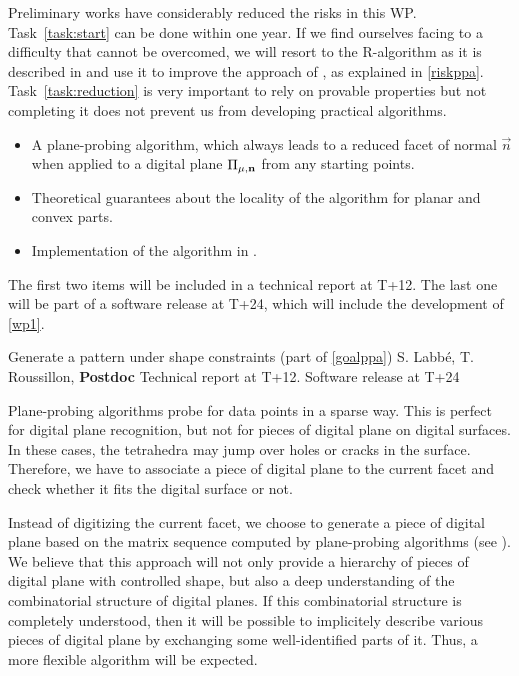 \Risks
Preliminary works have considerably reduced the risks in this WP. Task~\ref{task:start}
can be done within one year. If we find ourselves facing to a difficulty that cannot be overcomed,
we will resort to the R-algorithm as it is described in \cite{LPRJMIV2017} and use it
to improve the approach of \citeauthor*{Charrier2011} \cite{Charrier2011}, as explained
in \ref{riskppa}. Task~\ref{task:reduction} is very important to rely on provable
properties but not completing it does not prevent us from developing practical algorithms.

\Success
\begin{itemize}
    \item A plane-probing algorithm, which always leads to a
      reduced facet of normal $\vec{n}$ when applied to a digital
      plane $\Pi_{\mu,\mathbf{n}}$ from any starting points.
    \item Theoretical guarantees about the locality of the algorithm
      for planar and convex parts.   
    \item Implementation of the algorithm in \DGtal.   
\end{itemize}
The first two items will be included in a technical report at T+12.
The last one will be part of a software release at T+24, which will include
the development of \ref{wp1}. 

  

\medskip
{}
   {Generate a pattern under shape constraints (part of \ref{goalppa})}
   {S. Labb\'{e}, T. Roussillon, \textbf{Postdoc}}
   {Technical report at T+12. Software release at T+24}
\medskip

Plane-probing algorithms probe for data points in a sparse way.
This is perfect for digital plane recognition, but not for pieces
of digital plane on digital surfaces. In these cases, the tetrahedra
may jump over holes or cracks in the surface. Therefore, we have to
associate a piece of digital plane to the current facet and check
whether it fits the digital surface or not.

Instead of digitizing the current facet, we choose to generate a piece
of digital plane based on the matrix sequence computed by
plane-probing algorithms (see ). We believe that
this approach will not only provide a hierarchy of pieces of digital
plane with controlled shape, but also a deep understanding of the
combinatorial structure of digital planes. If this combinatorial
structure is completely understood, then it will be possible to implicitely
describe various pieces of digital plane by exchanging some well-identified
parts of it. Thus, a more flexible algorithm will be expected.  

